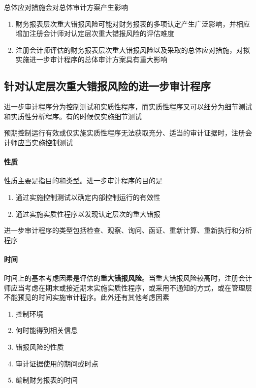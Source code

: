 \documentclass[UTF8,12pt]{ctexart}
\numberwithin{equation}{section} %
\numberwithin{figure}{section}
\numberwithin{table}{section}
\begin{document}
	总体应对措施会对总体审计方案产生影响
	\begin{enumerate}
		\item 财务报表层次重大错报风险可能对财务报表的多项认定产生广泛影响，并相应增加注册会计师对认定层次重大错报风险的评估难度
		
		\item 注册会计师评估的财务报表层次重大错报风险以及采取的总体应对措施，对拟实施进一步审计程序的总体审计方案具有重大影响
	\end{enumerate}
	
	\subsection{针对认定层次重大错报风险的进一步审计程序}
	进一步审计程序分为控制测试和实质性程序，而实质性程序又可以细分为细节测试和实质性分析程序。有的时候仅实施细节测试
	
	预期控制运行有效或仅实施实质性程序无法获取充分、适当的审计证据时，注册会计师应当实施控制测试
	
	\paragraph{性质}
	性质主要是指目的和类型。进一步审计程序的目的是
	\begin{enumerate}
		\item 通过实施控制测试以确定内部控制运行的有效性
		
		\item 通过实施实质性程序以发现认定层次的重大错报
	\end{enumerate}
	
	进一步审计程序的类型包括检查、观察、询问、函证、重新计算、重新执行和分析程序
	
	\paragraph{时间}
	时间上的基本考虑因素是评估的\textbf{重大错报风险}。当重大错报风险较高时，注册会计师应当考虑在期末或接近期末实施实质性程序，或采用不通知的方式，或在管理层不能预见的时间实施审计程序。此外还有其他考虑因素
	\begin{enumerate}
		\item 控制环境
		
		\item 何时能得到相关信息
		
		\item 错报风险的性质
		
		\item 审计证据使用的期间或时点
		
		\item 编制财务报表的时间
	\end{enumerate}
	
\end{document}
